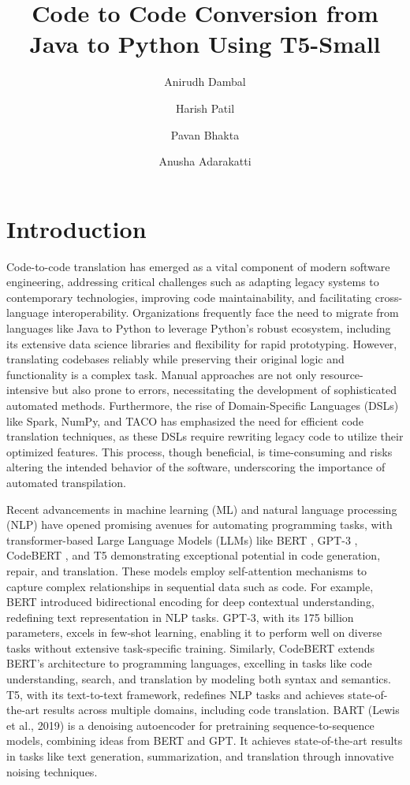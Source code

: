\documentclass{dhbenelux}
\author[1]{Anirudh Dambal}
\author[1]{Harish Patil}
\author[1]{Pavan Bhakta}
\author[1]{Anusha Adarakatti}
\affil{School of Computer Science and Engineering,
KLE Technological University, Hubballi, Karnataka, India, 580031}
\title{Code to Code Conversion from Java to Python
Using T5-Small}
\begin{document}
\maketitle

\section{Introduction}

Code-to-code translation has emerged as a vital component of modern software engineering, addressing critical challenges such as adapting legacy systems to contemporary technologies, improving code maintainability, and facilitating cross-language interoperability. Organizations frequently face the need to migrate from languages like Java to Python to leverage Python’s robust ecosystem, including its extensive data science libraries and flexibility for rapid prototyping. However, translating codebases reliably while preserving their original logic and functionality is a complex task. Manual approaches are not only resource-intensive but also prone to errors, necessitating the development of sophisticated automated methods. Furthermore, the rise of Domain-Specific Languages (DSLs) like Spark, NumPy, and TACO has emphasized the need for efficient code translation techniques, as these DSLs require rewriting legacy code to utilize their optimized features. This process, though beneficial, is time-consuming and risks altering the intended behavior of the software, underscoring the importance of automated transpilation.

Recent advancements in machine learning (ML) and natural language processing (NLP) have opened promising avenues for automating programming tasks, with transformer-based Large Language Models (LLMs) like BERT \cite{bert2018}, GPT-3 \cite{gpt32020}, CodeBERT \cite{codebert2020}, and T5 \cite{t52019} demonstrating exceptional potential in code generation, repair, and translation. These models employ self-attention mechanisms to capture complex relationships in sequential data such as code. For example, BERT introduced bidirectional encoding for deep contextual understanding, redefining text representation in NLP tasks. GPT-3, with its 175 billion parameters, excels in few-shot learning, enabling it to perform well on diverse tasks without extensive task-specific training. Similarly, CodeBERT extends BERT’s architecture to programming languages, excelling in tasks like code understanding, search, and translation by modeling both syntax and semantics. T5, with its text-to-text framework, redefines NLP tasks and achieves state-of-the-art results across multiple domains, including code translation. BART (Lewis et al., 2019) \cite{bart2019} is a denoising autoencoder for pretraining sequence-to-sequence models, combining ideas from BERT and GPT. It achieves state-of-the-art results in tasks like text generation, summarization, and translation through innovative noising techniques.
\end{document}
